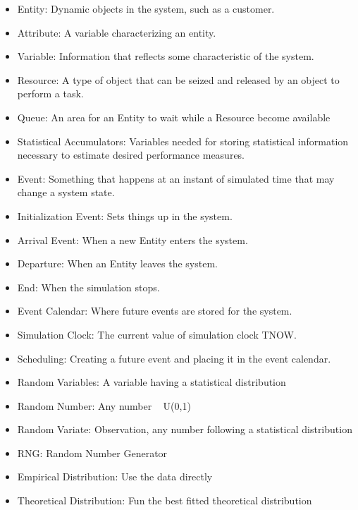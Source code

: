 \documentclass[12pt]{article}
\begin{document}
\begin{itemize}
\item Entity: Dynamic objects in the system, such as a customer. 

\item Attribute: A variable characterizing an entity. 

\item Variable: Information that reflects some characteristic of the system. 

\item Resource: A type of object that can be seized and released by an object to perform a task.

\item Queue: An area for an Entity to wait while a Resource become available

\item Statistical Accumulators: Variables needed for storing statistical information necessary to estimate desired performance measures. 

\item Event: Something that happens at an instant of simulated time that may change a system state. 

\item Initialization Event: Sets things up in the system.

\item Arrival Event: When a new Entity enters the system.

\item Departure: When an Entity leaves the system.

\item End: When the simulation stops.

\item Event Calendar: Where future events are stored for the system. 

\item Simulation Clock: The current value of simulation clock TNOW.

\item Scheduling: Creating a future event and placing it in the event calendar. 

\item Random Variables: A variable having a statistical distribution

\item Random Number: Any number ~ U(0,1)

\item Random Variate: Observation, any number following a statistical distribution

\item RNG: Random Number Generator

\item Empirical Distribution: Use the data directly

\item Theoretical Distribution: Fun the best fitted theoretical distribution

\end{itemize}
\end{document}
